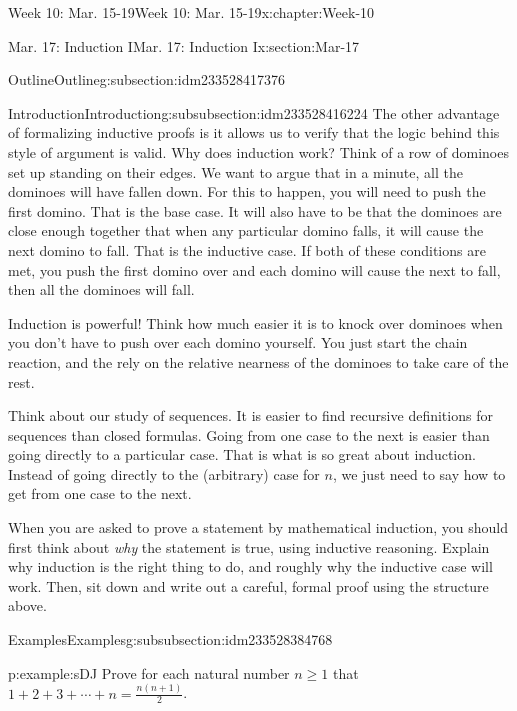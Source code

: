 \documentclass[oneside,10pt,]{book}
\numberwithin{equation}{section}
\renewcommand{\ge}{\geqslant}
\begin{document}
\begin{chapterptx}{Week 10: Mar. 15-19}{}{Week 10: Mar. 15-19}{}{}{x:chapter:Week-10}
\begin{sectionptx}{Mar. 17: Induction I}{}{Mar. 17: Induction I}{}{}{x:section:Mar-17}
\begin{subsectionptx}{Outline}{}{Outline}{}{}{g:subsection:idm233528417376}
\begin{subsubsectionptx}{Introduction}{}{Introduction}{}{}{g:subsubsection:idm233528416224}
The other advantage of formalizing inductive proofs is it allows us to verify that the logic behind this style of argument is valid. Why does induction work? Think of a row of dominoes set up standing on their edges. We want to argue that in a minute, all the dominoes will have fallen down. For this to happen, you will need to push the first domino. That is the base case. It will also have to be that the dominoes are close enough together that when any particular domino falls, it will cause the next domino to fall. That is the inductive case. If both of these conditions are met, you push the first domino over and each domino will cause the next to fall, then all the dominoes will fall.%
\par
Induction is powerful! Think how much easier it is to knock over dominoes when you don't have to push over each domino yourself. You just start the chain reaction, and the rely on the relative nearness of the dominoes to take care of the rest.%
\par
Think about our study of sequences. It is easier to find recursive definitions for sequences than closed formulas. Going from one case to the next is easier than going directly to a particular case. That is what is so great about induction. Instead of going directly to the (arbitrary) case for \(n\), we just need to say how to get from one case to the next.%
\par
When you are asked to prove a statement by mathematical induction, you should first think about \emph{why} the statement is true, using inductive reasoning. Explain why induction is the right thing to do, and roughly why the inductive case will work. Then, sit down and write out a careful, formal proof using the structure above.%
\end{subsubsectionptx}
%
%
\typeout{************************************************}
\typeout{************************************************}
%
\begin{subsubsectionptx}{Examples}{}{Examples}{}{}{g:subsubsection:idm233528384768}
\begin{example}{}{p:example:sDJ}%
Prove for each natural number \(n \ge 1\) that \(1 + 2 + 3 + \cdots + n = \frac{n(n+1)}{2}\).%
\par\smallskip%

\end{example}
\end{subsubsectionptx}
\end{subsectionptx}
\end{sectionptx}
\end{chapterptx}
\end{document}
